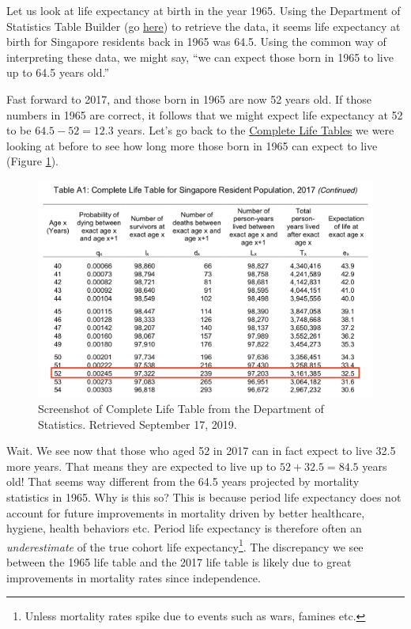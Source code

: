 \documentclass[openany]{book}
\let\rmarkdownfootnote\footnote%
\def\footnote{\protect\rmarkdownfootnote}
\begin{document}
Let us look at life expectancy at birth in the year 1965. Using the
Department of Statistics Table Builder (go
\href{https://www.tablebuilder.singstat.gov.sg/publicfacing/createDataTable.action?refId=13276}{here})
to retrieve the data, it seems life expectancy at birth for Singapore
residents back in 1965 was 64.5. Using the common way of interpreting
these data, we might say, ``we can expect those born in 1965 to live up
to 64.5 years old.''

Fast forward to 2017, and those born in 1965 are now 52 years old. If
those numbers in 1965 are correct, it follows that we might expect life
expectancy at 52 to be \(64.5 - 52 = 12.3\) years. Let's go back to the
\href{https://www.singstat.gov.sg/-/media/files/publications/population/lifetable17-18.pdf}{Complete
Life Tables} we were looking at before to see how long more those born
in 1965 can expect to live (Figure \ref{fig:apc-lifetabletwo}).

\begin{figure}

{\centering \includegraphics[width=0.8\linewidth]{images/apc/apc_lifetable2} 

}

\caption{Screenshot of Complete Life Table from the Department of Statistics. Retrieved September 17, 2019.}\label{fig:apc-lifetabletwo}
\end{figure}

Wait. We see now that those who aged 52 in 2017 can in fact expect to
live 32.5 more years. That means they are expected to live up to
\(52 + 32.5 = 84.5\) years old! That seems way different from the 64.5
years projected by mortality statistics in 1965. Why is this so? This is
because period life expectancy does not account for future improvements
in mortality driven by better healthcare, hygiene, health behaviors etc.
Period life expectancy is therefore often an \emph{underestimate} of the
true cohort life expectancy\footnote{Unless mortality rates spike due to
  events such as wars, famines etc.}. The discrepancy we see between the
1965 life table and the 2017 life table is likely due to great
improvements in mortality rates since independence.
\end{document}
